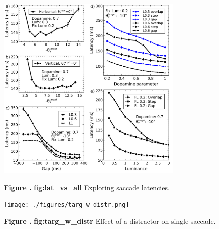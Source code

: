 \documentclass{frontiersSCNS}
\begin{document}
\begin{figure}[htb!]
\begin{center}
\includegraphics[width=0.8\textwidth]{./figures/lat_vs_everything.png}
\end{center}
\textbf{\label{fig:lat_vs_all} Figure .}
{ \textbf{fig:lat\_vs\_all} Exploring saccade latencies.}
\end{figure}

\begin{figure}[htb!]
\begin{center}
\texttt{[image: ./figures/targ\_w\_distr.png]}
\end{center}
\textbf{\label{fig:targ_w_distr} Figure .}
{ \textbf{fig:targ\_w\_distr} Effect of a distractor on single saccade.}
\end{figure}
\end{document}
